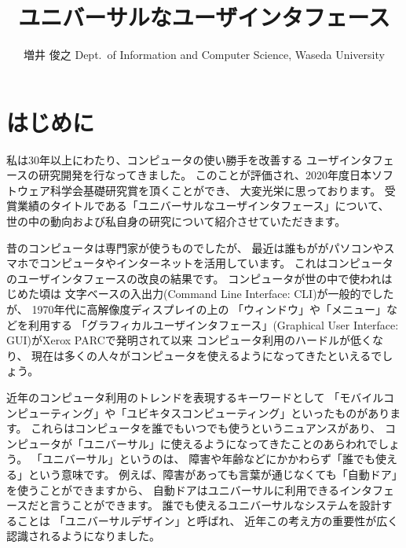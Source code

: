 \documentclass[topics]{compsoft} %
\begin{document}
\title{ユニバーサルなユーザインタフェース}

%
\author{増井 俊之
%
%
%
%
%
{Dept.\ of Information and Computer Science, Waseda University}
%
\shutten
%
%
}

%

\maketitle

\section{はじめに}

私は30年以上にわたり、コンピュータの使い勝手を改善する
ユーザインタフェースの研究開発を行なってきました。
このことが評価され、2020年度日本ソフトウェア科学会基礎研究賞を頂くことができ、
大変光栄に思っております。
受賞業績のタイトルである「ユニバーサルなユーザインタフェース」について、
世の中の動向および私自身の研究について紹介させていただきます。

昔のコンピュータは専門家が使うものでしたが、
最近は誰もががパソコンやスマホでコンピュータやインターネットを活用しています。
これはコンピュータのユーザインタフェースの改良の結果です。
コンピュータが世の中で使われはじめた頃は
文字ベースの入出力(Command Line Interface: CLI)が一般的でしたが、
1970年代に高解像度ディスプレイの上の
「ウィンドウ」や「メニュー」などを利用する
「グラフィカルユーザインタフェース」(Graphical User Interface: GUI)がXerox PARCで発明されて以来
コンピュータ利用のハードルが低くなり、
現在は多くの人々がコンピュータを使えるようになってきたといえるでしょう。

近年のコンピュータ利用のトレンドを表現するキーワードとして
「モバイルコンピューティング」や「ユビキタスコンピューティング」といったものがあります。
これらはコンピュータを誰でもいつでも使うというニュアンスがあり、
コンピュータが「ユニバーサル」に使えるようになってきたことのあらわれでしょう。
%
「ユニバーサル」というのは、
障害や年齢などにかかわらず「誰でも使える」という意味です。
例えば、障害があっても言葉が通じなくても「自動ドア」を使うことができますから、
自動ドアはユニバーサルに利用できるインタフェースだと言うことができます。
%
誰でも使えるユニバーサルなシステムを設計することは
「ユニバーサルデザイン」と呼ばれ、
近年この考え方の重要性が広く認識されるようになりました。
\end{document}
